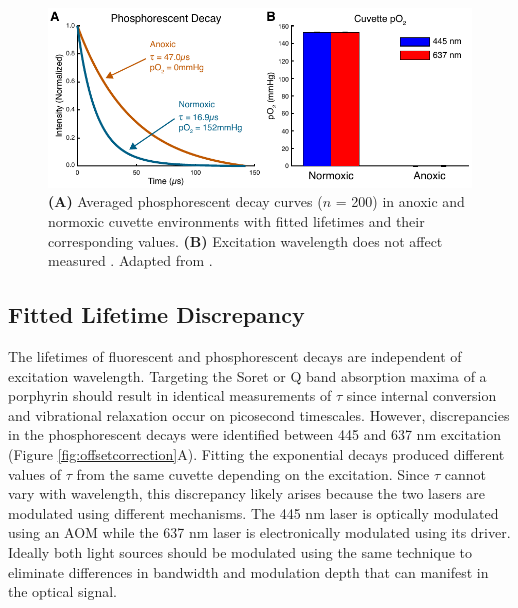 \begin{figure}
    \includegraphics{figures/chapter_2/cuvette.pdf}
    \caption[\textbf{(A)} Averaged phosphorescent decay curves ($n$ = 200) in anoxic and normoxic cuvette environments with fitted lifetimes and their corresponding  values. \textbf{(B)} Excitation wavelength does not affect measured .]{
        \label{fig:cuvette}
        \textbf{(A)} Averaged phosphorescent decay curves ($n$ = 200) in anoxic and normoxic cuvette environments with fitted lifetimes and their corresponding  values. \textbf{(B)} Excitation wavelength does not affect measured . Adapted from \cite{Sullender:2018ff}.
    }
\end{figure}

\subsection{Fitted Lifetime Discrepancy}

The lifetimes of fluorescent and phosphorescent decays are independent of excitation wavelength. Targeting the Soret or Q band absorption maxima of a porphyrin should result in identical measurements of $\tau$ since internal conversion and vibrational relaxation occur on picosecond timescales. However, discrepancies in the phosphorescent decays were identified between 445 and 637 nm excitation (Figure \ref{fig:offsetcorrection}A). Fitting the exponential decays produced different values of $\tau$ from the same cuvette depending on the excitation. Since $\tau$ cannot vary with wavelength, this discrepancy likely arises because the two lasers are modulated using different mechanisms. The 445 nm laser is optically modulated using an AOM while the 637 nm laser is electronically modulated using its driver. Ideally both light sources should be modulated using the same technique to eliminate differences in bandwidth and modulation depth that can manifest in the optical signal.


